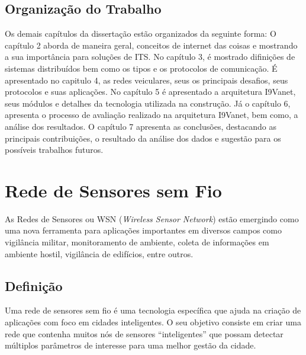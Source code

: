 \documentclass[
	12pt,				%
	oneside,			%
	a4paper,			%
	english,			%
	brazil				%
	]{abntex2ppgsi}
\begin{document}
\section{Organização do Trabalho}
Os demais capítulos da dissertação estão organizados da seguinte forma:
O capítulo 2 aborda de maneira geral, conceitos de internet das coisas e mostrando a sua importância para soluções de ITS. No capítulo 3, é mostrado difinições de sistemas distribuídos bem como os tipos e os protocolos de comunicação. É apresentado no capitulo 4, as redes veiculares, seus os principais desafios, seus protocolos  e suas aplicações. No capítulo 5 é apresentado a arquitetura I9Vanet, seus módulos e detalhes da tecnologia utilizada na construção. Já o capítulo 6, apresenta o processo de avaliação realizado na arquitetura I9Vanet, bem como, a análise dos resultados.
O capítulo 7 apresenta as conclusões, destacando as principais contribuições, o resultado da análise dos dados e sugestão para os possíveis trabalhos futuros.


\chapter{Rede de Sensores sem Fio}

As Redes de Sensores ou WSN (\textit{Wireless Sensor Network}) estão emergindo como uma nova ferramenta para aplicações importantes em diversos campos como vigilância militar, monitoramento de ambiente,  coleta de informações em ambiente hostil, vigilância de edifícios, entre outros. 

\section{Definição}
Uma rede de sensores sem fio é uma tecnologia específica que ajuda na criação de aplicações com foco em cidades inteligentes. O seu objetivo consiste em criar uma rede que contenha muitos nós de sensores ``inteligentes'' que possam detectar múltiplos parâmetros de interesse para uma melhor gestão da cidade.
\end{document}
